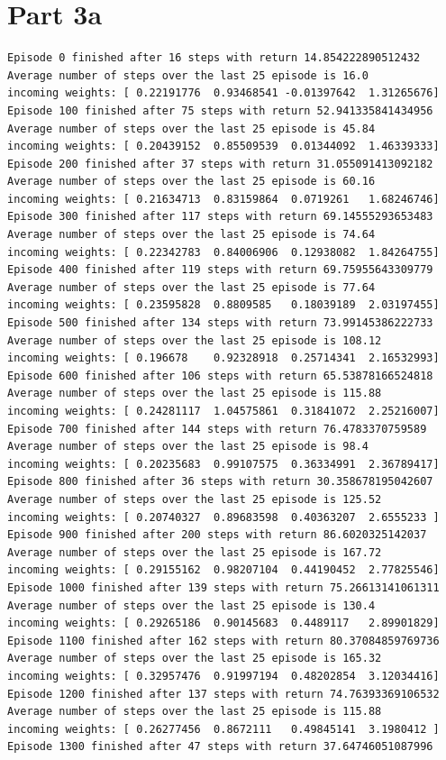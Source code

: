 \documentclass{article}
\newcommand{\enterProblemHeader}[1]{
}
\newcommand{\exitProblemHeader}[1]{
}
\newcounter{homeworkProblemCounter} %
\newcommand{\homeworkProblemName}{}
\newenvironment{homeworkProblem}[1][Part \arabic{homeworkProblemCounter}]{ %
\stepcounter{homeworkProblemCounter} %
\renewcommand{\homeworkProblemName}{#1} %
\section{\homeworkProblemName} %
\enterProblemHeader{\homeworkProblemName} %
}{
\exitProblemHeader{\homeworkProblemName} %
}
\begin{document}
\begin{homeworkProblem}[Part 3a]
\clearpage
\begin{verbatim}
Episode 0 finished after 16 steps with return 14.854222890512432
Average number of steps over the last 25 episode is 16.0
incoming weights: [ 0.22191776  0.93468541 -0.01397642  1.31265676]
Episode 100 finished after 75 steps with return 52.941335841434956
Average number of steps over the last 25 episode is 45.84
incoming weights: [ 0.20439152  0.85509539  0.01344092  1.46339333]
Episode 200 finished after 37 steps with return 31.055091413092182
Average number of steps over the last 25 episode is 60.16
incoming weights: [ 0.21634713  0.83159864  0.0719261   1.68246746]
Episode 300 finished after 117 steps with return 69.14555293653483
Average number of steps over the last 25 episode is 74.64
incoming weights: [ 0.22342783  0.84006906  0.12938082  1.84264755]
Episode 400 finished after 119 steps with return 69.75955643309779
Average number of steps over the last 25 episode is 77.64
incoming weights: [ 0.23595828  0.8809585   0.18039189  2.03197455]
Episode 500 finished after 134 steps with return 73.99145386222733
Average number of steps over the last 25 episode is 108.12
incoming weights: [ 0.196678    0.92328918  0.25714341  2.16532993]
Episode 600 finished after 106 steps with return 65.53878166524818
Average number of steps over the last 25 episode is 115.88
incoming weights: [ 0.24281117  1.04575861  0.31841072  2.25216007]
Episode 700 finished after 144 steps with return 76.4783370759589
Average number of steps over the last 25 episode is 98.4
incoming weights: [ 0.20235683  0.99107575  0.36334991  2.36789417]
Episode 800 finished after 36 steps with return 30.358678195042607
Average number of steps over the last 25 episode is 125.52
incoming weights: [ 0.20740327  0.89683598  0.40363207  2.6555233 ]
Episode 900 finished after 200 steps with return 86.6020325142037
Average number of steps over the last 25 episode is 167.72
incoming weights: [ 0.29155162  0.98207104  0.44190452  2.77825546]
Episode 1000 finished after 139 steps with return 75.26613141061311
Average number of steps over the last 25 episode is 130.4
incoming weights: [ 0.29265186  0.90145683  0.4489117   2.89901829]
Episode 1100 finished after 162 steps with return 80.37084859769736
Average number of steps over the last 25 episode is 165.32
incoming weights: [ 0.32957476  0.91997194  0.48202854  3.12034416]
Episode 1200 finished after 137 steps with return 74.76393369106532
Average number of steps over the last 25 episode is 115.88
incoming weights: [ 0.26277456  0.8672111   0.49845141  3.1980412 ]
Episode 1300 finished after 47 steps with return 37.64746051087996

\end{verbatim}
\end{homeworkProblem}
\end{document}
